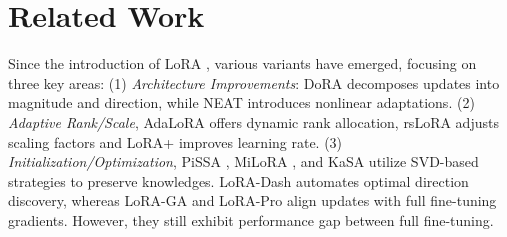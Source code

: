 \section{Related Work}
Since the introduction of LoRA \cite{hulora}, various variants have emerged, focusing on three key areas:
(1) \textit{Architecture Improvements}: DoRA \cite{liudora} decomposes updates into magnitude and direction, while NEAT \cite{zhong2024neatnonlinearparameterefficientadaptation} introduces nonlinear adaptations.
(2) \textit{Adaptive Rank/Scale}, AdaLoRA \cite{zhangadaptive} offers dynamic rank allocation, rsLoRA \cite{kalajdzievski2023rankstabilizationscalingfactor} adjusts scaling factors and LoRA+ \cite{hayou2024loraefficientlowrank} improves learning rate.
(3) \textit{Initialization/Optimization}, PiSSA \cite{meng2024pissa}, MiLoRA \cite{wang2024miloraharnessingminorsingular}, and KaSA \cite{wang2024kasaknowledgeawaresingularvalueadaptation} utilize SVD-based strategies to preserve knowledges. LoRA-Dash \cite{si2024unleashingpowertaskspecificdirections} automates optimal direction discovery, whereas LoRA-GA \cite{wanglora} and LoRA-Pro \cite{wang2024loraprolowrankadaptersproperly} align updates with full fine-tuning gradients. However, they still exhibit performance gap between full fine-tuning. 

